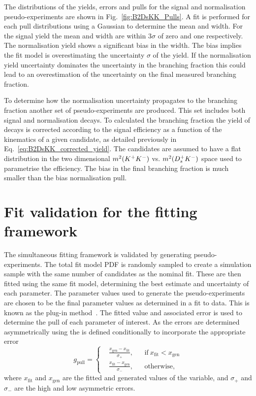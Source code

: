 
The distributions of the yields, errors and pulls for the signal and normalisation pseudo-experiments are shown in Fig.~\ref{fig:B2DsKK_Pulls}. A fit is performed for each pull distributions using a Gaussian to determine the mean and width. 
For the signal yield the mean and width are within $3\sigma$ of zero and one respectively. The normalisation yield shows a significant bias in the width. The bias implies the fit model is overestimating the uncertainty $\sigma$ of the yield.
If the normalisation yield uncertainty dominates the uncertainty in the branching fraction this could lead to an overestimation of the uncertainty on the final measured branching fraction.

To determine how the normalisation uncertainty propagates to the branching fraction another set of pseudo-experiments are produced.
This set includes both signal and normalisation decays. To calculated the branching fraction the yield of \decay{\Bp}{\Dsp\Kp\Km} decays is corrected according to the signal efficiency as a function of the kinematics of a given candidate, as detailed previously in Eq.~\ref{eq:B2DsKK_corrected_yield}. The candidates are assumed to have a flat distribution in the two dimensional $m^{2}({{K}^+}{{K}^-})$ vs. $m^{2}({{D}^+_{s}}{{K}^-})$ space used to parametrise the efficiency. The bias in the final branching fraction is much smaller than the bias normalisation pull.

\section{Fit validation for the \decay{\Bp}{\Dsp\phiz} fitting framework}
\label{sec:app_toys_B2DsPhi}

The simultaneous fitting framework is validated by generating pseudo-experiments. The total fit model PDF is randomly sampled to create a simulation sample with the same number of candidates as the nominal fit. These are then fitted using the same fit model, determining the best estimate and uncertainty of each parameter. The parameter values used to generate the pseudo-experiments are chosen to be the final parameter values as determined in a fit to data. This is known as the plug-in method~\cite{plugin}.
The fitted value and associated error is used to determine the pull of each parameter of interest. As the errors are determined asymmetrically using \minos the is defined conditionally to incorporate the appropriate error 
\begin{equation}
  g_{\text{pull}} = \left \{
  \begin{aligned}
    &\frac{x_{\text{gen}} - x_{\text{fit}} }{\sigma_{+}}, && \text{if}\ x_{\text{fit}} < x_{\text{gen}}\\
    &\frac{x_{\text{fit}} - x_{\text{gen}} }{\sigma_{-}}, && \text{otherwise},
  \end{aligned} \right.
\end{equation} 
where $x_{\text{fit}}$ and $x_{\text{gen}}$ are the fitted and generated values of the variable, and $\sigma_{+}$ and $\sigma_{-}$ are the high and low asymmetric errors.

